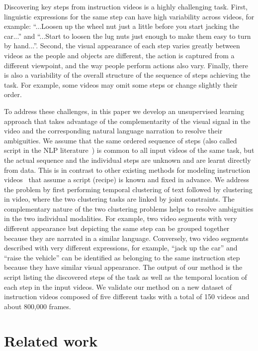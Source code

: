 \documentclass[10pt,twocolumn,letterpaper]{article}
\begin{document}
Discovering key steps from instruction videos is a highly challenging task.
First, linguistic expressions for the same step can have high variability across videos, for example: ``...Loosen up the wheel nut just a little before you start jacking the car...'' and ``...Start to loosen the lug nuts just enough to make them easy to turn by hand...''.
Second, the visual appearance of each step varies greatly between videos as the people and objects are different, the action is captured from a different viewpoint, and the way people perform actions also vary.
Finally, there is also a variability of the overall structure of the sequence of steps achieving the task. For example, 
some videos may omit some steps or change slightly their order.

To address these challenges, in this paper we develop an unsupervised learning approach that takes advantage of the complementarity of the 
visual signal in the video and the corresponding natural language narration to resolve their ambiguities. 
We assume that the same ordered sequence of steps (also called script in the NLP literature~\cite{Regneri10learning}) is common to all input videos of the same task, but the actual sequence and the individual steps are unknown and are learnt directly from data. 
This is in contrast to other existing methods for modeling instruction videos~\cite{Malmaud15what} that assume a script (recipe) is known and fixed in advance. 
We address the problem by first performing temporal clustering of text followed by clustering in video, where the two clustering tasks are linked by joint constraints. 
The complementary nature of the two clustering problems helps to resolve ambiguities in the two individual modalities. For example, two video segments with very different appearance but depicting the same step can be grouped together  because they are narrated in a similar language.
Conversely, two video segments described with very different expressions, for example, ``jack up the car'' and ``raise the vehicle'' can be identified as belonging to the same instruction step because they have similar visual appearance.
The output of our method is the script listing the discovered steps of the task as well as the temporal location of each step in the input videos. 
We validate our method on a new dataset of instruction videos composed of five different tasks with a total of 150 videos and about 800,000 frames.





\section{Related work}
\end{document}
